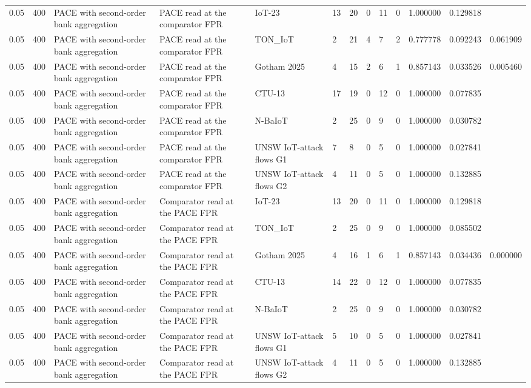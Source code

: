 \begin{tabular}{lllllllllllll}
0.05 & 400 & PACE with second-order bank aggregation & PACE read at the comparator FPR & IoT-23 & 13 & 20 & 0 & 11 & 0 & 1.000000 & 0.129818 &  \\
0.05 & 400 & PACE with second-order bank aggregation & PACE read at the comparator FPR & TON\_IoT & 2 & 21 & 4 & 7 & 2 & 0.777778 & 0.092243 & 0.061909 \\
0.05 & 400 & PACE with second-order bank aggregation & PACE read at the comparator FPR & Gotham 2025 & 4 & 15 & 2 & 6 & 1 & 0.857143 & 0.033526 & 0.005460 \\
0.05 & 400 & PACE with second-order bank aggregation & PACE read at the comparator FPR & CTU-13 & 17 & 19 & 0 & 12 & 0 & 1.000000 & 0.077835 &  \\
0.05 & 400 & PACE with second-order bank aggregation & PACE read at the comparator FPR & N-BaIoT & 2 & 25 & 0 & 9 & 0 & 1.000000 & 0.030782 &  \\
0.05 & 400 & PACE with second-order bank aggregation & PACE read at the comparator FPR & UNSW IoT-attack flows G1 & 7 & 8 & 0 & 5 & 0 & 1.000000 & 0.027841 &  \\
0.05 & 400 & PACE with second-order bank aggregation & PACE read at the comparator FPR & UNSW IoT-attack flows G2 & 4 & 11 & 0 & 5 & 0 & 1.000000 & 0.132885 &  \\
0.05 & 400 & PACE with second-order bank aggregation & Comparator read at the PACE FPR & IoT-23 & 13 & 20 & 0 & 11 & 0 & 1.000000 & 0.129818 &  \\
0.05 & 400 & PACE with second-order bank aggregation & Comparator read at the PACE FPR & TON\_IoT & 2 & 25 & 0 & 9 & 0 & 1.000000 & 0.085502 &  \\
0.05 & 400 & PACE with second-order bank aggregation & Comparator read at the PACE FPR & Gotham 2025 & 4 & 16 & 1 & 6 & 1 & 0.857143 & 0.034436 & 0.000000 \\
0.05 & 400 & PACE with second-order bank aggregation & Comparator read at the PACE FPR & CTU-13 & 14 & 22 & 0 & 12 & 0 & 1.000000 & 0.077835 &  \\
0.05 & 400 & PACE with second-order bank aggregation & Comparator read at the PACE FPR & N-BaIoT & 2 & 25 & 0 & 9 & 0 & 1.000000 & 0.030782 &  \\
0.05 & 400 & PACE with second-order bank aggregation & Comparator read at the PACE FPR & UNSW IoT-attack flows G1 & 5 & 10 & 0 & 5 & 0 & 1.000000 & 0.027841 &  \\
0.05 & 400 & PACE with second-order bank aggregation & Comparator read at the PACE FPR & UNSW IoT-attack flows G2 & 4 & 11 & 0 & 5 & 0 & 1.000000 & 0.132885 &  \\

\end{tabular}
